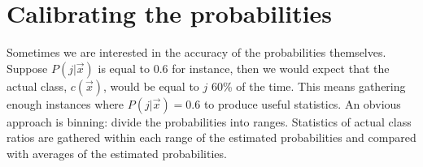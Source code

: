 \documentclass{article}
\begin{document}
\section{Calibrating the probabilities}

Sometimes we are interested in the accuracy of the probabilities themselves.
Suppose $P(j|\vec x)$ is equal to 0.6 for instance, then we would expect
that the actual class, $c(\vec x)$, would be equal to $j$ 60\% of the time.
This means gathering enough instances where $P(j|\vec x)=0.6$ to produce
useful statistics.
An obvious approach is binning: divide the probabilities into ranges.
Statistics of actual class ratios are gathered within each range of the estimated
probabilities and compared with averages of the estimated probabilities.


 
\end{document}
